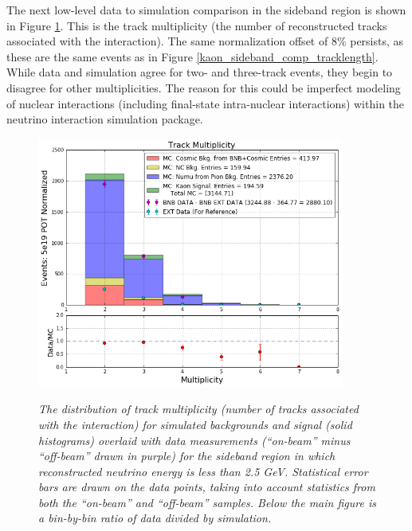 The next low-level data to simulation comparison in the sideband region is shown in Figure \ref{kaon_sideband_comp_multiplicity}. This is the track multiplicity (the number of reconstructed tracks associated with the interaction). The same normalization offset of 8\% persists, as these are the same events as in Figure \ref{kaon_sideband_comp_tracklength}. While data and simulation agree for two- and  three-track events, they begin to disagree for other multiplicities. The reason for this could be imperfect modeling of nuclear interactions (including final-state intra-nuclear interactions) within the neutrino interaction simulation package.\\

\begin{figure}[ht!]
\centering
	\includegraphics[width=0.9\textwidth]{Figures/kaon_sideband_comp_multiplicity.png} \\
\caption{\textit{The distribution of track multiplicity (number of tracks associated with the interaction) for simulated backgrounds and signal (solid histograms) overlaid with data measurements (``on-beam'' minus ``off-beam'' drawn in purple) for the sideband region in which reconstructed neutrino energy is less than 2.5 GeV. Statistical error bars are drawn on the data points, taking into account statistics from both the ``on-beam'' and ``off-beam'' samples. Below the main figure is a bin-by-bin ratio of data divided by simulation.}}\label{kaon_sideband_comp_multiplicity}
\end{figure}


